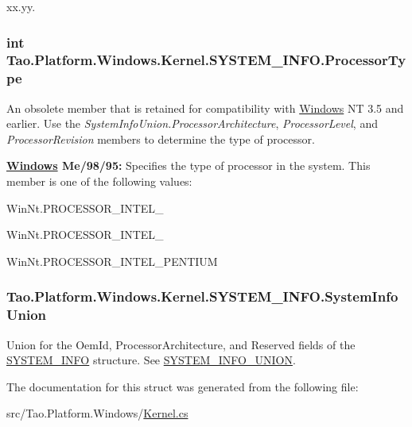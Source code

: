 xx.yy. 

\hypertarget{struct_tao_1_1_platform_1_1_windows_1_1_kernel_1_1_s_y_s_t_e_m___i_n_f_o_ac5729610c75fec173cab9d4e363bcc03}{
\subsubsection[{ProcessorType}]{\setlength{\rightskip}{0pt plus 5cm}int {\bf Tao.Platform.Windows.Kernel.SYSTEM\_\-INFO.ProcessorType}}}
\label{struct_tao_1_1_platform_1_1_windows_1_1_kernel_1_1_s_y_s_t_e_m___i_n_f_o_ac5729610c75fec173cab9d4e363bcc03}


An obsolete member that is retained for compatibility with \hyperlink{namespace_tao_1_1_platform_1_1_windows}{Windows} NT 3.5 and earlier. Use the {\itshape SystemInfoUnion.ProcessorArchitecture\/}, {\itshape ProcessorLevel\/}, and {\itshape ProcessorRevision\/} members to determine the type of processor. 

{\bfseries \hyperlink{namespace_tao_1_1_platform_1_1_windows}{Windows} Me/98/95:} Specifies the type of processor in the system. This member is one of the following values: 

WinNt.PROCESSOR\_\-INTEL\_ 

WinNt.PROCESSOR\_\-INTEL\_ 

WinNt.PROCESSOR\_\-INTEL\_\-PENTIUM 

\hypertarget{struct_tao_1_1_platform_1_1_windows_1_1_kernel_1_1_s_y_s_t_e_m___i_n_f_o_a6e86574f6bf20eeb3067718c06c919ad}{
\subsubsection[{SystemInfoUnion}]{ {\bf Tao.Platform.Windows.Kernel.SYSTEM\_\-INFO.SystemInfoUnion}}}
\label{struct_tao_1_1_platform_1_1_windows_1_1_kernel_1_1_s_y_s_t_e_m___i_n_f_o_a6e86574f6bf20eeb3067718c06c919ad}


Union for the OemId, ProcessorArchitecture, and Reserved fields of the \hyperlink{struct_tao_1_1_platform_1_1_windows_1_1_kernel_1_1_s_y_s_t_e_m___i_n_f_o}{SYSTEM\_\-INFO} structure. See \hyperlink{struct_tao_1_1_platform_1_1_windows_1_1_kernel_1_1_s_y_s_t_e_m___i_n_f_o___u_n_i_o_n}{SYSTEM\_\-INFO\_\-UNION}. 



The documentation for this struct was generated from the following file:\begin{DoxyCompactItemize}
\item 
src/Tao.Platform.Windows/\hyperlink{_kernel_8cs}{Kernel.cs}\end{DoxyCompactItemize}
